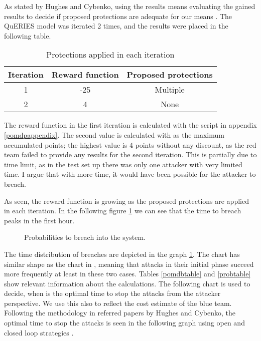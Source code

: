 As stated by Hughes and Cybenko, using the results means evaluating
the gained results to decide if proposed protections are adequate for
our means \cite{hughes2013quantitative}. The QuERIES model was
iterated 2 times, and the results were placed in the following table.

\begin{table}[h!]
\centering
\begin{tabular}{|c|c|c|}
  \hline Iteration & Reward function & Proposed protections \\ \hline
  1 & -25 & Multiple \\ \hline 2 & 4 & None \\ \hline
\end{tabular}
\caption{Protections applied in each iteration}
\label{iterationtable}
\end{table}

The reward function in the first iteration is calculated with the
script in appendix \ref{pomdpappendix}. The second value is calculated
with as the maximum accumulated points; the highest value is 4 points
without any discount, as the red team failed to provide any results
for the second iteration. This is partially due to time limit, as in the test
set up there was only one attacker with very limited time. I argue
that with more time, it would have been possible for the attacker to breach.

As seen, the reward function is growing as the proposed protections
are applied in each iteration. In the following figure
\ref{timetobreach} we can see that
the time to breach peaks in the first hour.

\begin{figure}[t!]
\centerline{}
\caption{Probabilities to breach into the system.}
\label{timetobreach}
\end{figure}

The time distribution of breaches are depicted in the graph
\ref{timetobreach}. The chart has similar shape as the chart in
\cite{carin2008cybersecurity}, meaning that attacks in their initial
phase succeed more frequently at least in these two cases.
Tables
\ref{pomdbtable} and \ref{probtable} show relevant information about
the calculations.
The following chart is used to decide, when is the optimal time to
stop the attacks from the attacker perspective. We use this also to
reflect the cost estimate of the blue team. Following the methodology
in referred papers by Hughes and Cybenko, the optimal time to stop the
attacks is seen in the following graph using open and closed loop
strategies \cite{hughes2013quantitative, carin2008cybersecurity}.


